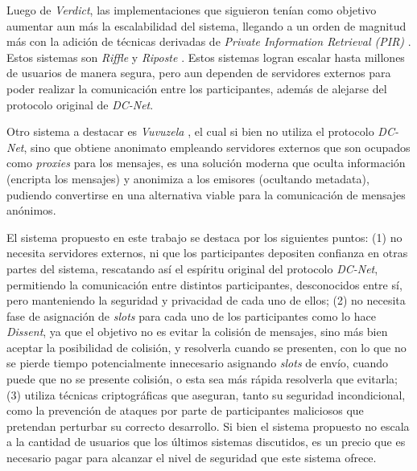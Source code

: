 Luego de \emph{Verdict}, las implementaciones que siguieron tenían como objetivo 
aumentar aun más la escalabilidad del sistema, llegando a un orden de magnitud más 
con la adición de técnicas derivadas de \emph{Private Information Retrieval (PIR)} 
\cite{chor1995private}. Estos sistemas son \emph{Riffle} \cite{kwon2016riffle} y 
\emph{Riposte} \cite{corrigan2015riposte}. Estos sistemas logran escalar hasta 
millones de usuarios de manera segura, pero aun dependen de servidores externos 
para poder realizar la comunicación entre los participantes, además de alejarse del 
protocolo original de \emph{DC-Net}.

Otro sistema a destacar es \emph{Vuvuzela} \cite{van2015vuvuzela}, el cual si bien no 
utiliza el protocolo \emph{DC-Net}, sino que obtiene anonimato empleando 
servidores externos que son ocupados como \emph{proxies} para los mensajes, es una 
solución moderna que oculta información (encripta los mensajes) y anonimiza a los 
emisores (ocultando metadata), pudiendo convertirse en una alternativa viable 
para la comunicación de mensajes anónimos.

El sistema propuesto en este trabajo se destaca por los siguientes puntos: (1) no necesita 
servidores externos, ni que los participantes depositen confianza en otras partes del sistema, 
rescatando así el espíritu original del protocolo \emph{DC-Net}, permitiendo la comunicación 
entre distintos participantes, desconocidos entre sí, pero manteniendo la seguridad y privacidad 
de cada uno de ellos; (2) no necesita fase de asignación de \emph{slots} para cada uno 
de los participantes como lo hace \emph{Dissent}, ya que el objetivo no es evitar la 
colisión de mensajes, sino más bien aceptar la posibilidad de colisión, y resolverla 
cuando se presenten, con lo que no se pierde tiempo potencialmente innecesario asignando 
\emph{slots} de envío, cuando puede que no se presente colisión, o esta sea más rápida 
resolverla que evitarla; (3) utiliza técnicas criptográficas que aseguran, tanto su seguridad 
incondicional, como la prevención de ataques por parte de participantes maliciosos 
que pretendan perturbar su correcto desarrollo. Si bien el sistema propuesto no 
escala a la cantidad de usuarios que los últimos sistemas discutidos, es un precio 
que es necesario pagar para alcanzar el nivel de seguridad que este sistema ofrece.